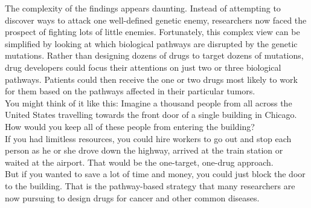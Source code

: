 \documentclass{article}
\begin{document}
The complexity of the findings appears daunting. Instead of attempting to discover ways to attack one well-defined genetic enemy, researchers now faced the prospect of fighting lots of little enemies. Fortunately, this complex view can be simplified by looking at which biological pathways are disrupted by the genetic mutations. Rather than designing dozens of drugs to target dozens of mutations, drug developers could focus their attentions on just two or three biological pathways. Patients could then receive the one or two drugs most likely to work for them based on the pathways affected in their particular tumors.\\
You might think of it like this: Imagine a thousand people from all across the United States travelling towards the front door of a single building in Chicago. How would you keep all of these people from entering the building?\\
If you had limitless resources, you could hire workers to go out and stop each person as he or she drove down the highway, arrived at the train station or waited at the airport. That would be the one-target, one-drug approach.\\
But if you wanted to save a lot of time and money, you could just block the door to the building. That is the pathway-based strategy that many researchers are now pursuing to design drugs for cancer and other common diseases.\\
\end{document}

